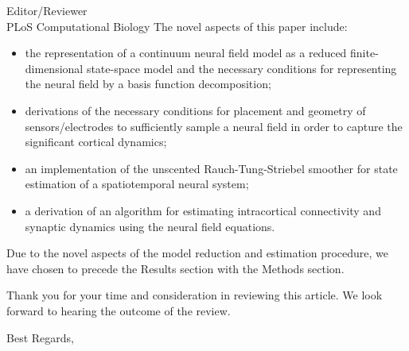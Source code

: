 \documentclass[a4paper,10pt]{letter}
\begin{document}
\begin{letter}{Editor/Reviewer \\ PLoS Computational Biology}
The novel aspects of this paper include:
\begin{itemize}
	\item the representation of a continuum neural field model as a reduced finite-dimensional state-space model and the necessary conditions for representing the neural field by a basis function decomposition;
	\item derivations of the necessary conditions for placement and geometry of sensors/electrodes to sufficiently sample a neural field in order to capture the significant cortical dynamics;
	\item an implementation of the unscented Rauch-Tung-Striebel smoother for state estimation of a spatiotemporal neural system;
	\item a derivation of an algorithm for estimating intracortical connectivity and synaptic dynamics using the neural field equations.
\end{itemize}

Due to the novel aspects of the model reduction and estimation procedure, we have chosen to precede the Results section with the Methods section.

Thank you for your time and consideration in reviewing this article. We look forward to hearing the outcome of the review.

\closing{Best Regards,}

% 
\end{letter}
\end{document}
